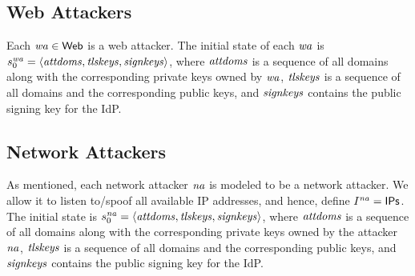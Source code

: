   
  \subsection{Web Attackers}\label{app:webattackers-uppresso}
  Each $\mathit{wa} \in \mathsf{Web}$ is a web attacker. 
  The initial state of each $\mathit{wa}$ is 
  $s_0^{\mathit{wa}} = \langle\mathit{attdoms}, \mathit{tlskeys}, \mathit{signkeys}\rangle$, 
  where $\mathit{attdoms}$ is a sequence of all domains along with 
  the corresponding private keys owned by $\mathit{wa}$, 
  $\mathit{tlskeys}$ is a sequence of all domains and 
  the corresponding public keys, and 
  $\mathit{signkeys}$ contains the public signing key for the IdP. 
  
  \subsection{Network Attackers}\label{app:networkattackers-uppresso}
  As mentioned, each network attacker $\mathit{na}$ is modeled to 
  be a network attacker. We allow it to listen to/spoof all 
  available IP addresses, and hence, define 
  $I^{\mathit{na}} = \mathsf{IPs}$. 
  The initial state is $s_0^{\mathit{na}} = 
  \langle\mathit{attdoms}, \mathit{tlskeys}, \mathit{signkeys}\rangle$, 
  where $\mathit{attdoms}$ is a sequence of all domains along with 
  the corresponding private keys owned by the attacker 
  $\mathit{na}$, $\mathit{tlskeys}$ is a sequence of all domains 
  and the corresponding public keys, and 
  $\mathit{signkeys}$ contains the public signing key for the IdP. 
  
